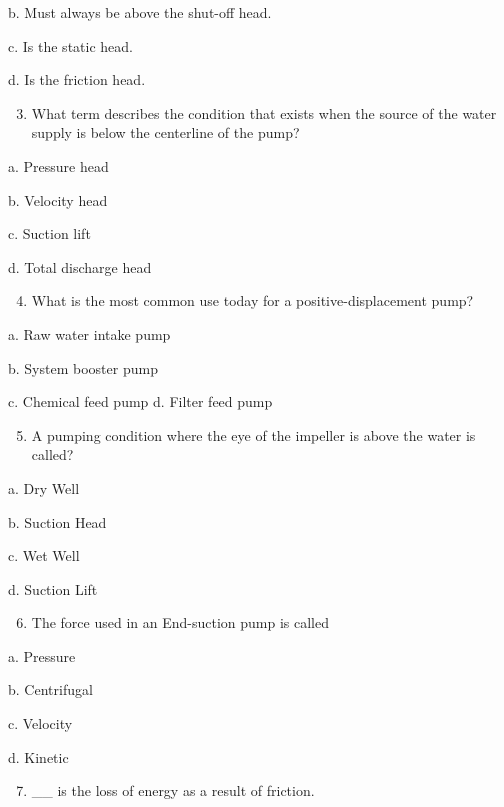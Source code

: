 \documentclass[10pt]{article}
\begin{document}
\begin{enumerate}
\begin{enumerate}
b. Must always be above the shut-off head.

c. Is the static head.

d. Is the friction head.

\begin{enumerate}
  \setcounter{enumi}{2}
  \item What term describes the condition that exists when the source of the water supply is below the centerline of the pump?
\end{enumerate}

a. Pressure head

b. Velocity head

c. Suction lift

d. Total discharge head

\begin{enumerate}
  \setcounter{enumi}{3}
  \item What is the most common use today for a positive-displacement pump?
\end{enumerate}

a. Raw water intake pump

b. System booster pump

c. Chemical feed pump d. Filter feed pump

\begin{enumerate}
  \setcounter{enumi}{4}
  \item A pumping condition where the eye of the impeller is above the water is called?
\end{enumerate}

a. Dry Well

b. Suction Head

c. Wet Well

d. Suction Lift

\begin{enumerate}
  \setcounter{enumi}{5}
  \item The force used in an End-suction pump is called
\end{enumerate}

a. Pressure

b. Centrifugal

c. Velocity

d. Kinetic

\begin{enumerate}
  \setcounter{enumi}{6}
  \item \_\_ is the loss of energy as a result of friction.
\end{enumerate}


\end{enumerate}
\end{enumerate}
\end{document}
